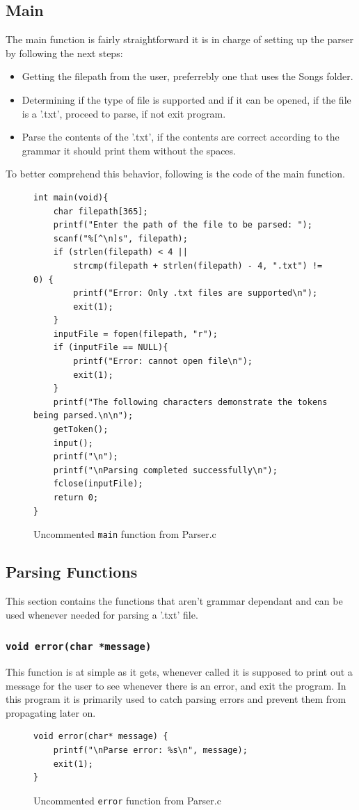 \documentclass{article}
\begin{document}
\subsection{Main}
The main function is fairly straightforward it is in charge of setting up the parser by following the next steps:
\begin{itemize}
    \item Getting the filepath from the user, preferrebly one that uses the Songs folder.
    \item Determining if the type of file is supported and if it can be opened, if the file is a '.txt', proceed to parse, if not exit program. 
    \item Parse the contents of the '.txt', if the contents are correct according to the grammar it should print them without the spaces.
\end{itemize}
To better comprehend this behavior, following is the code of the main function. 
\begin{figure}[H]
    \begin{lstlisting}
int main(void){
    char filepath[365];
    printf("Enter the path of the file to be parsed: ");
    scanf("%[^\n]s", filepath);
    if (strlen(filepath) < 4 || 
        strcmp(filepath + strlen(filepath) - 4, ".txt") != 0) {
        printf("Error: Only .txt files are supported\n");
        exit(1);
    }
    inputFile = fopen(filepath, "r");
    if (inputFile == NULL){
        printf("Error: cannot open file\n");
        exit(1);
    }
    printf("The following characters demonstrate the tokens being parsed.\n\n");
    getToken();
    input();
    printf("\n");
    printf("\nParsing completed successfully\n");
    fclose(inputFile);
    return 0;
}
    \end{lstlisting}
    \caption{Uncommented \texttt{main} function from Parser.c}
\end{figure}
\subsection{Parsing Functions}
This section contains the functions that aren't grammar dependant and can be used whenever needed for parsing a '.txt' file.
\subsubsection{\texttt{void error(char *message)}}
This function is at simple as it gets, whenever called it is supposed to print out a message for the user to see whenever there is an error, and exit the program. In this program it is primarily used to catch parsing errors and prevent them from propagating later on.
\begin{figure}[H]
    \begin{lstlisting}
void error(char* message) {
    printf("\nParse error: %s\n", message);
    exit(1);
}
    \end{lstlisting}
    \caption{Uncommented \texttt{error} function from Parser.c}
\end{figure}
\end{document}
